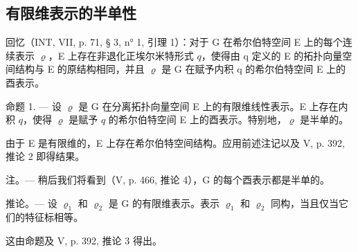 \subsection{有限维表示的半单性}

回忆（INT, VII, p. 71, § 3, n° 1, 引理 1）：对于 G 在希尔伯特空间 E 上的每个连续表示 \(\varrho\)，E 上存在非退化正埃尔米特形式 \(q\)，使得由 q 定义的 E 的拓扑向量空间结构与 E 的原结构相同，并且 \(\varrho\) 是 G 在赋予内积 q 的希尔伯特空间 E 上的酉表示。

命题 1. --- 设 \(\varrho\) 是 G 在分离拓扑向量空间 E 上的有限维线性表示。E 上存在内积 \(q\)，使得 \(\varrho\) 是赋予 \(q\) 的希尔伯特空间 E 上的酉表示。特别地，\(\varrho\) 是半单的。

由于 E 是有限维的，E 上存在希尔伯特空间结构。应用前述注记以及 V, p. 392, 推论 2 即得结果。

注。--- 稍后我们将看到（V, p. 466, 推论 4），G 的每个酉表示都是半单的。

推论。--- 设 \(\varrho_{1}\) 和 \(\varrho_{2}\) 是 G 的有限维表示。表示 \(\varrho_{1}\) 和 \(\varrho_{2}\) 同构，当且仅当它们的特征标相等。

这由命题及 V, p. 392, 推论 3 得出。


